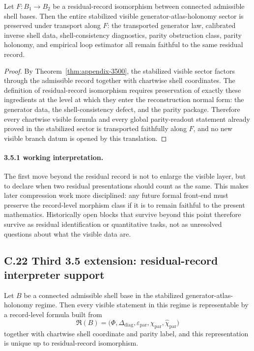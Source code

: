 \begin{theorem}
\label{thm:appendix-3501}
Let $F:B_1\to B_2$ be a residual-record isomorphism between connected admissible shell bases. Then the entire stabilized visible generator-atlas-holonomy sector is preserved under transport along $F$: the transported generator law, calibrated inverse shell data, shell-consistency diagnostics, parity obstruction class, parity holonomy, and empirical loop estimator all remain faithful to the same residual record.
\end{theorem}

\begin{proof}
By Theorem~\ref{thm:appendix-3500}, the stabilized visible sector factors through the admissible record together with chartwise shell coordinates. The definition of residual-record isomorphism requires preservation of exactly these ingredients at the level at which they enter the reconstruction normal form: the generator data, the shell-consistency defect, and the parity package. Therefore every chartwise visible formula and every global parity-readout statement already proved in the stabilized sector is transported faithfully along $F$, and no new visible branch datum is opened by this translation.
\end{proof}

\paragraph{3.5.1 working interpretation.}
The first move beyond the residual record is not to enlarge the visible layer, but to declare when two residual presentations should count as the same. This makes later compression work more disciplined: any future formal front-end must preserve the record-level morphism class if it is to remain faithful to the present mathematics. Historically open blocks that survive beyond this point therefore survive as residual identification or quantitative tasks, not as unresolved questions about what the visible data are.


\subsection*{C.22 Third 3.5 extension: residual-record interpreter support}

\begin{theorem}
\label{thm:appendix-3502}
Let $B$ be a connected admissible shell base in the stabilized generator-atlas-holonomy regime. Then every visible statement in this regime is representable by a record-level formula built from
\[
  \mathfrak R(B)=\bigl(\Phi,\Delta_{\mathrm{diag}},\varepsilon_{\mathrm{par}},\chi_{\mathrm{par}},\widehat\chi_{\mathrm{par}}\bigr)
\]
together with chartwise shell coordinate and parity label, and this representation is unique up to residual-record isomorphism.
\end{theorem}

